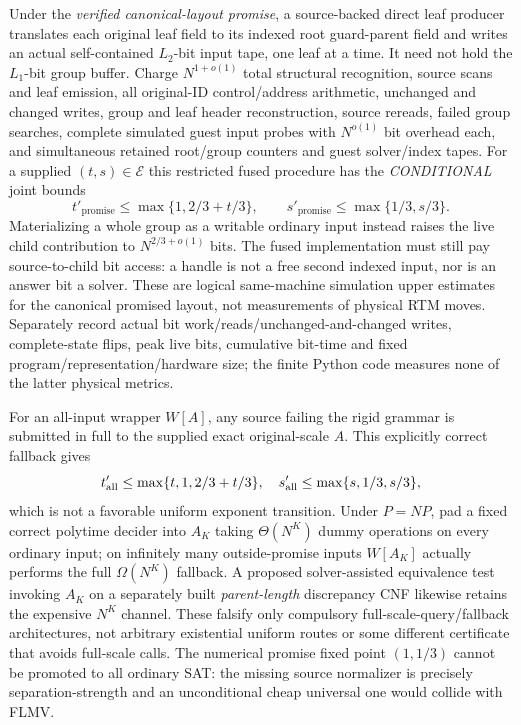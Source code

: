 \documentclass[11pt]{article}
\begin{document}
Under the \emph{verified canonical-layout promise}, a source-backed direct leaf producer translates each original leaf field to its indexed root guard-parent field and writes an actual self-contained $L_2$-bit input tape, one leaf at a time. It need not hold the $L_1$-bit group buffer. Charge $N^{1+o(1)}$ total structural recognition, source scans and leaf emission, all original-ID control/address arithmetic, unchanged and changed writes, group and leaf header reconstruction, source rereads, failed group searches, complete simulated guest input probes with $N^{o(1)}$ bit overhead each, and simultaneous retained root/group counters and guest solver/index tapes. For a supplied $(t,s)\in\mathcal E$ this restricted fused procedure has the \emph{CONDITIONAL} joint bounds
\[
t'_{\mathrm{promise}}\le\max\{1,2/3+t/3\},\qquad
s'_{\mathrm{promise}}\le\max\{1/3,s/3\}.
\]
Materializing a whole group as a writable ordinary input instead raises the live child contribution to $N^{2/3+o(1)}$ bits. The fused implementation must still pay source-to-child bit access: a handle is not a free second indexed input, nor is an answer bit a solver. These are logical same-machine simulation upper estimates for the canonical promised layout, not measurements of physical RTM moves. Separately record actual bit work/reads/unchanged-and-changed writes, complete-state flips, peak live bits, cumulative bit-time and fixed program/representation/hardware size; the finite Python code measures none of the latter physical metrics.

For an all-input wrapper $W[A]$, any source failing the rigid grammar is submitted in full to the supplied exact original-scale $A$. This explicitly correct fallback gives
\[
t'_{\rm all}\le\max\{t,1,2/3+t/3\},\quad
s'_{\rm all}\le\max\{s,1/3,s/3\},
\]
which is not a favorable uniform exponent transition. Under $P=NP$, pad a fixed correct polytime decider into $A_K$ taking $\Theta(N^K)$ dummy operations on every ordinary input; on infinitely many outside-promise inputs $W[A_K]$ actually performs the full $\Omega(N^K)$ fallback. A proposed solver-assisted equivalence test invoking $A_K$ on a separately built \emph{parent-length} discrepancy CNF likewise retains the expensive $N^K$ channel. These falsify only compulsory full-scale-query/fallback architectures, not arbitrary existential uniform routes or some different certificate that avoids full-scale calls. The numerical promise fixed point $(1,1/3)$ cannot be promoted to all ordinary SAT: the missing source normalizer is precisely separation-strength and an unconditional cheap universal one would collide with FLMV.
\end{document}
